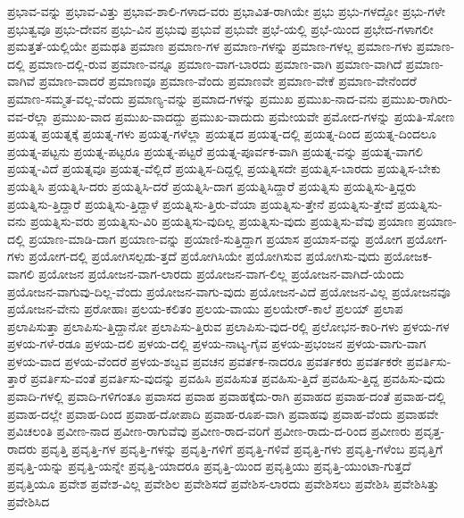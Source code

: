 {ಪ್ರಭಾವ-ವನ್ನು
ಪ್ರಭಾವ-ವಿತ್ತು
ಪ್ರಭಾವ-ಶಾಲಿ-ಗಳಾದ-ವರು
ಪ್ರಭಾವಿತ-ರಾಗಿಯೇ
ಪ್ರಭು
ಪ್ರಭು-ಗಳದ್ದೋ
ಪ್ರಭು-ಗಳೇ
ಪ್ರಭುತ್ವವೂ
ಪ್ರಭು-ದೇವನ
ಪ್ರಭು-ವಿನ
ಪ್ರಭುವು
ಪ್ರಭುವೆ
ಪ್ರಭುವೇ
ಪ್ರಭೆ-ಯಲ್ಲಿ
ಪ್ರಭೆ-ಯಿಂದ
ಪ್ರಭೇದ-ಗಳಾಗಲೀ
ಪ್ರಮತ್ತತೆ-ಯಲ್ಲಿಯೇ
ಪ್ರಮಥತಿ
ಪ್ರಮಾಣ
ಪ್ರಮಾಣ-ಗಳ
ಪ್ರಮಾಣ-ಗಳನ್ನು
ಪ್ರಮಾಣ-ಗಳಲ್ಲ
ಪ್ರಮಾಣ-ಗಳು
ಪ್ರಮಾಣ-ದಲ್ಲಿ
ಪ್ರಮಾಣ-ದಲ್ಲಿ-ರುವ
ಪ್ರಮಾಣ-ವನ್ನೂ
ಪ್ರಮಾಣ-ವಾಗ-ಬಾರದು
ಪ್ರಮಾಣ-ವಾಗಿ
ಪ್ರಮಾಣ-ವಾಗಿದೆ
ಪ್ರಮಾಣ-ವಾಗಿವೆ
ಪ್ರಮಾಣ-ವಾದರೆ
ಪ್ರಮಾಣವೂ
ಪ್ರಮಾಣ-ವೆಂದು
ಪ್ರಮಾಣವೇ
ಪ್ರಮಾಣ-ವೇಕೆ
ಪ್ರಮಾಣ-ವೇನೆಂದರೆ
ಪ್ರಮಾಣ-ಸಮ್ಮತ-ವಲ್ಲ-ವೆಂದು
ಪ್ರಮಾಣ್ಯ-ವನ್ನು
ಪ್ರಮಾದ-ಗಳನ್ನು
ಪ್ರಮುಖ
ಪ್ರಮುಖ-ನಾದ-ವನು
ಪ್ರಮುಖ-ರಾಗಿರು-ವವ-ರೆಲ್ಲಾ
ಪ್ರಮುಖ-ವಾದ
ಪ್ರಮುಖ-ವಾದದ್ದು
ಪ್ರಮುಖ-ವಾದುದು
ಪ್ರಮೇಯವೇ
ಪ್ರಮೋದ-ಗಳನ್ನು
ಪ್ರಯತಿ-ಸೋಣ
ಪ್ರಯತ್ನ
ಪ್ರಯತ್ನಕ್ಕೆ
ಪ್ರಯತ್ನ-ಗಳು
ಪ್ರಯತ್ನ-ಗಳೆಲ್ಲಾ
ಪ್ರಯತ್ನದ
ಪ್ರಯತ್ನ-ದಲ್ಲಿ
ಪ್ರಯತ್ನ-ದಿಂದ
ಪ್ರಯತ್ನ-ದಿಂದಲೂ
ಪ್ರಯತ್ನ-ಪಟ್ಟನು
ಪ್ರಯತ್ನ-ಪಟ್ಟರೂ
ಪ್ರಯತ್ನ-ಪಟ್ಟರೆ
ಪ್ರಯತ್ನ-ಪೂರ್ವಕ-ವಾಗಿ
ಪ್ರಯತ್ನ-ವನ್ನು
ಪ್ರಯತ್ನ-ವಾಗಲಿ
ಪ್ರಯತ್ನ-ವಿದೆ
ಪ್ರಯತ್ನವೂ
ಪ್ರಯತ್ನ-ವೆಲ್ಲಿದೆ
ಪ್ರಯತ್ನಿಸ-ದಿದ್ದಲ್ಲಿ
ಪ್ರಯತ್ನಿಸದೇ
ಪ್ರಯತ್ನಿಸ-ಬಾರದು
ಪ್ರಯತ್ನಿಸ-ಬೇಕು
ಪ್ರಯತ್ನಿಸಿ
ಪ್ರಯತ್ನಿಸಿ-ದರು
ಪ್ರಯತ್ನಿಸಿ-ದರೆ
ಪ್ರಯತ್ನಿಸಿ-ದಾಗ
ಪ್ರಯತ್ನಿಸಿದ್ದಾರೆ
ಪ್ರಯತ್ನಿಸು
ಪ್ರಯತ್ನಿಸು-ತ್ತಿದ್ದರು
ಪ್ರಯತ್ನಿಸು-ತ್ತಿದ್ದಾರೆ
ಪ್ರಯತ್ನಿಸು-ತ್ತಿದ್ದಾಳೆ
ಪ್ರಯತ್ನಿಸು-ತ್ತಿರು-ವೆಯಾ
ಪ್ರಯತ್ನಿಸು-ತ್ತೇನೆ
ಪ್ರಯತ್ನಿಸು-ತ್ತೇವೆ
ಪ್ರಯತ್ನಿಸು-ವನು
ಪ್ರಯತ್ನಿಸು-ವರು
ಪ್ರಯತ್ನಿಸು-ವಿರಿ
ಪ್ರಯತ್ನಿಸು-ವುದಿಲ್ಲ
ಪ್ರಯತ್ನಿಸು-ವುದು
ಪ್ರಯತ್ನಿಸು-ವೆವು
ಪ್ರಯಾಣ
ಪ್ರಯಾಣ-ದಲ್ಲಿ
ಪ್ರಯಾಣ-ಮಾಡಿ-ದಾಗ
ಪ್ರಯಾಣ-ವನ್ನು
ಪ್ರಯಾಣಿ-ಸುತ್ತಿದ್ದಾಗ
ಪ್ರಯಾಸ
ಪ್ರಯಾಸ-ವನ್ನು
ಪ್ರಯೋಗ
ಪ್ರಯೋಗ-ಗಳು
ಪ್ರಯೋಗ-ದಲ್ಲಿ
ಪ್ರಯೋಗಿಸಲ್ಪಡು-ತ್ತದೆ
ಪ್ರಯೋಗಿಸಿಯೇ
ಪ್ರಯೋಗಿಸುವ
ಪ್ರಯೋಗಿಸು-ವುದು
ಪ್ರಯೋಜಕ-ವಾಗಲಿ
ಪ್ರಯೋಜನ
ಪ್ರಯೋಜನ-ವಾಗ-ಲಾರದು
ಪ್ರಯೋಜನ-ವಾಗ-ಲಿಲ್ಲ
ಪ್ರಯೋಜನ-ವಾಗಿದೆ-ಯೆಂದು
ಪ್ರಯೋಜನ-ವಾಗುವು-ದಿಲ್ಲ-ವೆಂದು
ಪ್ರಯೋಜನ-ವಾಗು-ವುದು
ಪ್ರಯೋಜನ-ವಿದೆ
ಪ್ರಯೋಜನ-ವಿಲ್ಲ
ಪ್ರಯೋಜನವೂ
ಪ್ರಯೋಜನ-ವೇನು
ಪ್ರರೋಹಾಃ
ಪ್ರಲಯ-ಕಲಿತಂ
ಪ್ರಲಯ-ವಾಯು
ಪ್ರಲಯೇರ್-ಕಾಲೆ
ಪ್ರಲಯ್
ಪ್ರಲಾಪ
ಪ್ರಲಾಪಿಸುತ್ತಾ
ಪ್ರಲಾಪಿಸು-ತ್ತಿದ್ದಾನೋ
ಪ್ರಲಾಪಿಸು-ತ್ತಿರುವ
ಪ್ರಲಾಪಿಸು-ವುದ-ರಲ್ಲಿ
ಪ್ರಲೋಭನ-ಕಾರಿ-ಗಳು
ಪ್ರಳಯ-ಗಳ
ಪ್ರಳಯ-ಗಳೆ-ರಡೂ
ಪ್ರಳಯ-ದಲಿ
ಪ್ರಳಯ-ದಲ್ಲಿ
ಪ್ರಳಯ-ನಾಟ್ಯ-ಗೈವ
ಪ್ರಳಯ-ಪ್ರಭಂಜನ
ಪ್ರಳಯ-ವಾಗು-ವಾಗ
ಪ್ರಳಯ-ವಾದ
ಪ್ರಳಯ-ವೆಂದರೆ
ಪ್ರಳಯ-ಶಬ್ದವ
ಪ್ರವಚನ
ಪ್ರವರ್ತಕ-ನಾದರೂ
ಪ್ರವರ್ತಕರು
ಪ್ರವರ್ತಕರೇ
ಪ್ರವರ್ತಿಸು-ತ್ತಾರೆ
ಪ್ರವರ್ತಿಸು-ವಂತೆ
ಪ್ರವರ್ತಿಸು-ವುದನ್ನು
ಪ್ರವಹಿಸಿ
ಪ್ರವಹಿಸುತ
ಪ್ರವಹಿಸು-ತ್ತಿದೆ
ಪ್ರವಹಿಸು-ತ್ತಿದ್ದ
ಪ್ರವಹಿಸು-ವುದು
ಪ್ರವಾದಿ-ಗಳಲ್ಲಿ
ಪ್ರವಾದಿ-ಗಳಿಗಂತೂ
ಪ್ರವಾಸದ
ಪ್ರವಾಹ
ಪ್ರವಾಹಕ್ಕೆದು-ರಾಗಿ
ಪ್ರವಾಹದ
ಪ್ರವಾಹ-ದಂತೆ
ಪ್ರವಾಹ-ದಲ್ಲಿ
ಪ್ರವಾಹ-ದಲ್ಲೇ
ಪ್ರವಾಹ-ದಿಂದ
ಪ್ರವಾಹ-ದೋಪಾದಿ
ಪ್ರವಾಹ-ರೂಪ-ವಾಗಿ
ಪ್ರವಾಹವು
ಪ್ರವಾಹ-ವೆಂದು
ಪ್ರವಾಹವೇ
ಪ್ರವಿಚಲಂತಿ
ಪ್ರವೀಣ-ನಾದ
ಪ್ರವೀಣ-ರಾಗುವೆವು
ಪ್ರವೀಣ-ರಾದ-ವರಿಗೆ
ಪ್ರವೀಣ-ರಾದು-ದ-ರಿಂದ
ಪ್ರವೀಣರು
ಪ್ರವೃತ್ತ-ರಾದರು
ಪ್ರವೃತ್ತಿ
ಪ್ರವೃತ್ತಿ-ಗಳ
ಪ್ರವೃತ್ತಿ-ಗಳನ್ನು
ಪ್ರವೃತ್ತಿ-ಗಳಿಗೆ
ಪ್ರವೃತ್ತಿ-ಗಳಿವೆ
ಪ್ರವೃತ್ತಿ-ಗಳು
ಪ್ರವೃತ್ತಿ-ಗಳೆಂಬ
ಪ್ರವೃತ್ತಿಗೆ
ಪ್ರವೃತ್ತಿ-ಯನ್ನು
ಪ್ರವೃತ್ತಿ-ಯನ್ನೇ
ಪ್ರವೃತ್ತಿ-ಯಾದರೂ
ಪ್ರವೃತ್ತಿ-ಯಿಂದ
ಪ್ರವೃತ್ತಿಯು
ಪ್ರವೃತ್ತಿ-ಯುಂಟಾ-ಗುತ್ತದೆ
ಪ್ರವೃತ್ತಿಯೂ
ಪ್ರವೇಶ
ಪ್ರವೇಶ-ವಿಲ್ಲ
ಪ್ರವೇಶಿಲ
ಪ್ರವೇಶಿಸದೆ
ಪ್ರವೇಶಿಸ-ಲಾರದು
ಪ್ರವೇಶಿಸಲು
ಪ್ರವೇಶಿಸಿ
ಪ್ರವೇಶಿಸಿತ್ತು
ಪ್ರವೇಶಿಸಿದ
}
